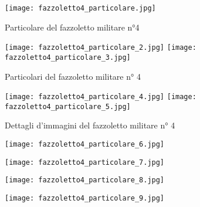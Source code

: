 \newpage

\begin{figure}[h]
	\centering
		\texttt{[image: fazzoletto4\_particolare.jpg]}
	\caption{Particolare del fazzoletto militare n°4}
	\label{fig:fazzoletto4_particolare}
\end{figure}

\newpage

\begin{figure}[h]
	\centering
		\texttt{[image: fazzoletto4\_particolare\_2.jpg]}
	\centering
		\texttt{[image: fazzoletto4\_particolare\_3.jpg]}
	\caption{Particolari del fazzoletto militare n° 4}
	\label{fig:fazzoletto4_particolare_2_3}
\end{figure}

\newpage

\begin{figure}[h]
	\centering
		\texttt{[image: fazzoletto4\_particolare\_4.jpg]}
	\centering
		\texttt{[image: fazzoletto4\_particolare\_5.jpg]}
	\caption{Dettagli d’immagini del fazzoletto militare n° 4}
	\label{fig:fazzoletto4_particolare_4_5}
\end{figure}

\newpage

\begin{figure}[h]
	\centering
		\texttt{[image: fazzoletto4\_particolare\_6.jpg]}
	\caption{}
	\label{fig:fazzoletto4_particolare_6}
\end{figure}

\newpage

\begin{figure}[h]
	\centering
		\texttt{[image: fazzoletto4\_particolare\_7.jpg]}
	\caption{}
	\label{fig:fazzoletto4_particolare_7}
\end{figure}

\newpage

\begin{figure}[h]
	\centering
		\texttt{[image: fazzoletto4\_particolare\_8.jpg]}
	\caption{}
	\label{fig:fazzoletto4_particolare_8}
\end{figure}

\newpage

\begin{figure}[h]
	\centering
		\texttt{[image: fazzoletto4\_particolare\_9.jpg]}
	\caption{}
	\label{fig:fazzoletto4_particolare_9}
\end{figure}

